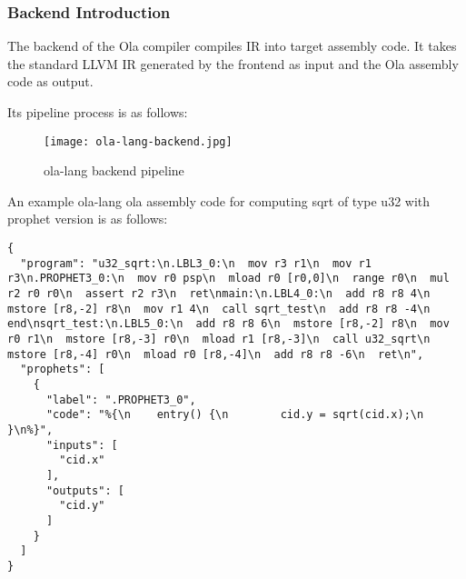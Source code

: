\subsubsection{Backend Introduction}

The backend of the Ola compiler compiles IR into target assembly code. It takes the standard LLVM IR generated by the frontend as input and the Ola assembly code as output.

Its pipeline process is as follows:
\begin{figure}[!htbp]
    \centering
    \texttt{[image: ola-lang-backend.jpg]}
    \caption{ola-lang backend pipeline}
    \label{fig:ola-lang-backend}
\end{figure}

An example ola-lang ola assembly code for computing sqrt of type u32 with prophet version is as follows:
\begin{lstlisting}[language={}]
{
  "program": "u32_sqrt:\n.LBL3_0:\n  mov r3 r1\n  mov r1 r3\n.PROPHET3_0:\n  mov r0 psp\n  mload r0 [r0,0]\n  range r0\n  mul r2 r0 r0\n  assert r2 r3\n  ret\nmain:\n.LBL4_0:\n  add r8 r8 4\n  mstore [r8,-2] r8\n  mov r1 4\n  call sqrt_test\n  add r8 r8 -4\n  end\nsqrt_test:\n.LBL5_0:\n  add r8 r8 6\n  mstore [r8,-2] r8\n  mov r0 r1\n  mstore [r8,-3] r0\n  mload r1 [r8,-3]\n  call u32_sqrt\n  mstore [r8,-4] r0\n  mload r0 [r8,-4]\n  add r8 r8 -6\n  ret\n",
  "prophets": [
    {
      "label": ".PROPHET3_0",
      "code": "%{\n    entry() {\n        cid.y = sqrt(cid.x);\n    }\n%}",
      "inputs": [
        "cid.x"
      ],
      "outputs": [
        "cid.y"
      ]
    }
  ]
}
\end{lstlisting}

